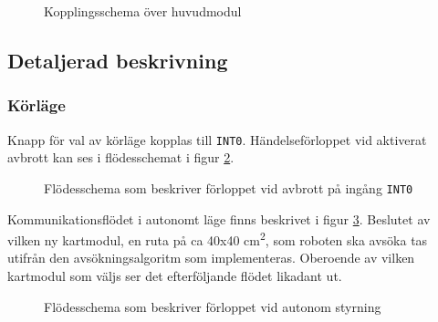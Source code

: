 \documentclass[11pt]{article}
\begin{document}
\begin{flushleft}
\begin{figure}[htbp]
\centering
\noindent{}
	\caption{Kopplingsschema över huvudmodul \label{kopplingsschema:huvudmodul}}	
\end{figure}

\subsection{Detaljerad beskrivning}
\subsubsection {Körläge}
Knapp för val av körläge kopplas till \verb+INT0+. Händelseförloppet vid aktiverat avbrott kan ses i flödesschemat i figur \ref{avbrott_korlage}.

\begin{figure}[htbp]
\centering
\noindent\resizebox{.6\linewidth}{!}{
	}
	\cprotect\caption{Flödesschema som beskriver förloppet vid avbrott på ingång \verb+INT0+ \label{avbrott_korlage}}	
\end{figure}

Kommunikationsflödet i autonomt läge finns beskrivet i figur \ref{autonomousMode}. Beslutet av vilken ny kartmodul, en ruta på ca 40x40 cm\textsuperscript{2}, som roboten ska avsöka tas utifrån den avsökningsalgoritm som implementeras. Oberoende av vilken kartmodul som väljs ser det efterföljande flödet likadant ut.

\begin{figure}[htbp]
\centering
\noindent\resizebox{0.9\linewidth}{!}{
	}
	\cprotect\caption{Flödesschema som beskriver förloppet vid autonom styrning \label{autonomousMode}}	
\end{figure}



\end{flushleft}
\end{document}
